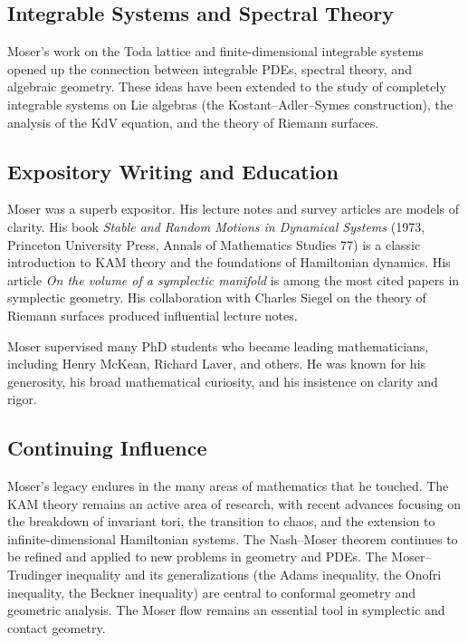 \subsection{Integrable Systems and Spectral Theory}

Moser's work on the Toda lattice and finite-dimensional integrable systems opened up the connection between integrable PDEs, spectral theory, and algebraic geometry. These ideas have been extended to the study of completely integrable systems on Lie algebras (the Kostant--Adler--Symes construction), the analysis of the KdV equation, and the theory of Riemann surfaces.

\subsection{Expository Writing and Education}

Moser was a superb expositor. His lecture notes and survey articles are models of clarity. His book \textit{Stable and Random Motions in Dynamical Systems} (1973, Princeton University Press, Annals of Mathematics Studies 77) is a classic introduction to KAM theory and the foundations of Hamiltonian dynamics. His article \textit{On the volume of a symplectic manifold} is among the most cited papers in symplectic geometry. His collaboration with Charles Siegel on the theory of Riemann surfaces produced influential lecture notes.

Moser supervised many PhD students who became leading mathematicians, including Henry McKean, Richard Laver, and others. He was known for his generosity, his broad mathematical curiosity, and his insistence on clarity and rigor.

\subsection{Continuing Influence}

Moser's legacy endures in the many areas of mathematics that he touched. The KAM theory remains an active area of research, with recent advances focusing on the breakdown of invariant tori, the transition to chaos, and the extension to infinite-dimensional Hamiltonian systems. The Nash--Moser theorem continues to be refined and applied to new problems in geometry and PDEs. The Moser--Trudinger inequality and its generalizations (the Adams inequality, the Onofri inequality, the Beckner inequality) are central to conformal geometry and geometric analysis. The Moser flow remains an essential tool in symplectic and contact geometry.

